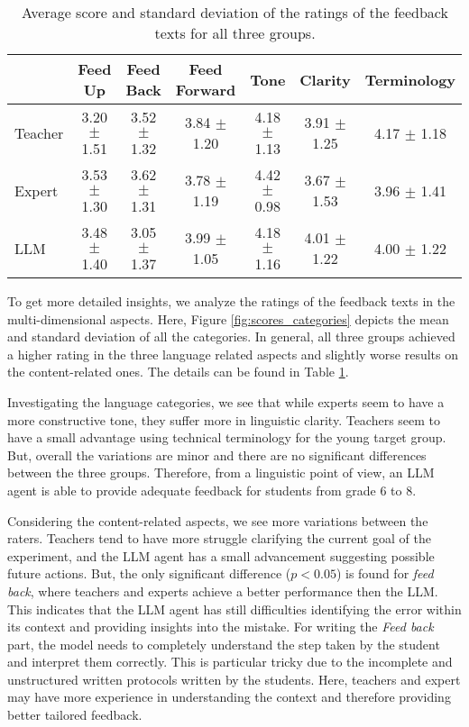 \begin{table}[htbp]
    \centering
    \begin{tabular}{lcccccc}
    \toprule
    & Feed Up & Feed Back & Feed Forward & Tone & Clarity & Terminology \\
    \midrule
Teacher & 3.20 $\pm$ 1.51  & 3.52 $\pm$ 1.32  & 3.84 $\pm$ 1.20  & 4.18 $\pm$ 1.13  & 3.91 $\pm$ 1.25  & 4.17 $\pm$ 1.18  \\ 
Expert & 3.53 $\pm$ 1.30  & 3.62 $\pm$ 1.31  & 3.78 $\pm$ 1.19  & 4.42 $\pm$ 0.98  & 3.67 $\pm$ 1.53  & 3.96 $\pm$ 1.41  \\ 
LLM & 3.48 $\pm$ 1.40  & 3.05 $\pm$ 1.37  & 3.99 $\pm$ 1.05  & 4.18 $\pm$ 1.16  & 4.01 $\pm$ 1.22  & 4.00 $\pm$ 1.22  \\ 
\bottomrule
    \end{tabular}
    \caption{Average score and standard deviation of the ratings of the feedback texts for all three groups.}
    \label{tab:scores_categories}
\end{table}

To get more detailed insights, we analyze the ratings of the feedback texts in the multi-dimensional aspects. Here, Figure \ref{fig:scores_categories} depicts the mean and standard deviation of all the categories. In general, all three groups achieved a higher rating in the three language related aspects and slightly worse results on the content-related ones. The details can be found in Table \ref{tab:scores_categories}.

Investigating the language categories, we see that while experts seem to have a more constructive tone, they suffer more in linguistic clarity. Teachers seem to have a small advantage using technical terminology for the young target group. But, overall the variations are minor and there are no significant differences between the three groups. Therefore, from a linguistic point of view, an LLM agent is able to provide adequate feedback for students from grade 6 to 8.

Considering the content-related aspects, we see more variations between the raters. Teachers tend to have more struggle clarifying the current goal of the experiment, and the LLM agent has a small advancement suggesting possible future actions. But, the only significant difference ($p<0.05$) is found for \textit{feed back}, where teachers and experts achieve a better performance then the LLM. This indicates that the LLM agent has still difficulties identifying the error within its context and providing insights into the mistake. For writing the \textit{Feed back} part, the model needs to completely understand the step taken by the student and interpret them correctly. This is particular tricky due to the incomplete and unstructured written protocols written by the students. Here, teachers and expert may have more experience in understanding the context and therefore providing better tailored feedback. %




